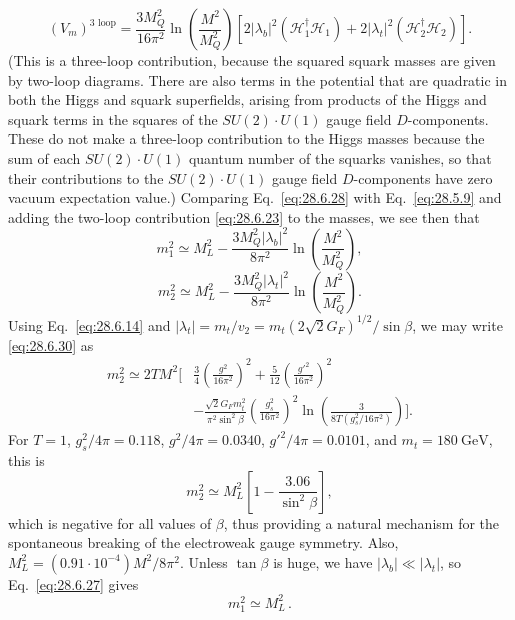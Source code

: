 \begin{equation}
  (V_m)^{\text{3 loop}}
  =\frac{3M_Q^2}{16\pi^2}\ln\left(\frac{M^2}{M_Q^2}\right)
  \left[
    2\lvert\lambda_b\rvert^2(\mathcal{H}_1^\dagger\mathcal{H}_1)
    +2\lvert\lambda_t\rvert^2(\mathcal{H}_2^\dagger\mathcal{H}_2)
  \right].
  \tag{28.6.28}\label{eq:28.6.28}
\end{equation}
(This is a three-loop contribution, because the squared squark masses are
given by two-loop diagrams. There are also terms in the potential that are
quadratic in both the Higgs and squark superfields, arising from products
of the Higgs and squark terms in the squares of the
\(SU(2)\mathbin{\cdot}U(1)\) gauge field \(D\)-components. These do not
make a three-loop contribution to the Higgs masses because the sum of each
\(SU(2)\mathbin{\cdot}U(1)\) quantum number of the squarks vanishes, so
that their contributions to the \(SU(2)\mathbin{\cdot}U(1)\) gauge field
\(D\)-components have zero vacuum expectation value.) Comparing
Eq.~\eqref{eq:28.6.28} with Eq.~\eqref{eq:28.5.9} and adding the two-loop
contribution \eqref{eq:28.6.23} to the masses, we see then that
\begin{equation}
  m_1^2\simeq M_L^2
  -\frac{3M_Q^2\lvert\lambda_b\rvert^2}{8\pi^2}
   \ln\left(\frac{M^2}{M_Q^2}\right),
  \tag{28.6.29}\label{eq:28.6.29}
\end{equation}
\begin{equation}
  m_2^2\simeq M_L^2
  -\frac{3M_Q^2\lvert\lambda_t\rvert^2}{8\pi^2}
   \ln\left(\frac{M^2}{M_Q^2}\right).
  \tag{28.6.30}\label{eq:28.6.30}
\end{equation}
Using Eq.~\eqref{eq:28.6.14} and
\(\lvert\lambda_t\rvert=m_t/v_2
=m_t(2\sqrt{2}G_F)^{1/2}/\sin\beta\), we may write
\eqref{eq:28.6.30} as
\begin{equation}
  \begin{aligned}
    m_2^2\simeq2TM^2\Bigg[
      &\frac{3}{4}\left(\frac{g^2}{16\pi^2}\right)^2
      +\frac{5}{12}\left(\frac{g'^2}{16\pi^2}\right)^2\\
      &-\frac{\sqrt{2}G_Fm_t^2}{\pi^2\sin^2\beta}
       \left(\frac{g_s^2}{16\pi^2}\right)^2
       \ln\left(\frac{3}{8T(g_s^2/16\pi^2)}\right)
    \Bigg].
  \end{aligned}
  \tag{28.6.31}\label{eq:28.6.31}
\end{equation}
For \(T=1\), \(g_s^2/4\pi=0.118\), \(g^2/4\pi=0.0340\),
\(g'^2/4\pi=0.0101\), and \(m_t=180\ \mathrm{GeV}\), this is
\begin{equation}
  m_2^2\simeq M_L^2
  \left[1-\frac{3.06}{\sin^2\beta}\right],
  \tag{28.6.32}\label{eq:28.6.32}
\end{equation}
which is negative for all values of \(\beta\), thus providing a natural
mechanism for the spontaneous breaking of the electroweak gauge symmetry.
Also, \(M_L^2=(0.91\mathbin{\cdot}10^{-4})M^2/8\pi^2\). Unless
\(\tan\beta\) is huge, we have
\(\lvert\lambda_b\rvert\ll\lvert\lambda_t\rvert\), so
Eq.~\eqref{eq:28.6.27} gives
\begin{equation}
  m_1^2\simeq M_L^2\,.
  \tag{28.6.33}\label{eq:28.6.33}
\end{equation}

